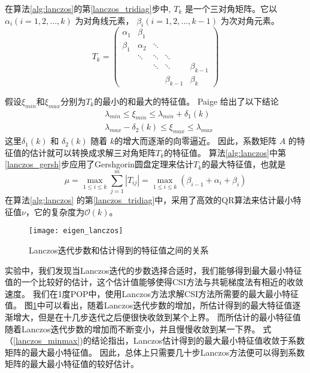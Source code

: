 在算法\ref{alg:lanczos}的第\ref{lanczos_tridiag}步中, $T_k$ 是一个三对角矩阵。它以 $\alpha_i (i=1,2,...,k)$ 为对角线元素， $\beta_i (i=1,2,...,k-1)$ 为次对角元素。 
\[ T_{k} = \left(\begin{array}{ccccc}
\alpha_1 & \beta_1  &  &&  \\
\beta_1 & \alpha_2  & \ddots &&  \\
  & \ddots & \ddots & \ddots&  \\
  &    &\ddots  &\ddots& \beta_{k-1} \\
 &    &  &\beta_{k-1}& \beta_{k} 
\end{array} \right)\]

假设$\xi_{min}$和$\xi_{max}$分别为$T_k$的最小的和最大的特征值。
Paige\cite{Paige1980235} 给出了以下结论
\begin{equation}\label{lanczos_minmax}
\begin{aligned} 
&\lambda_{min} \le \xi_{min} \le \lambda_{min}+\delta_1(k) \\
&\lambda_{max}-\delta_2(k)  \le \xi_{max} \le \lambda_{max}
\end{aligned}
\end{equation}
这里$\delta_1(k)$ 和 $\delta_2(k)$ 随着 $k$的增大而逐渐的向零逼近。 因此，系数矩阵 $A$ 的特征值的估计就可以转换成求解三对角矩阵$T_k$的特征值。 
算法\ref{alg:lanczos}中第\ref{lanczos_gersh}步应用了Gershgorin圆盘定理来估计$T_k$的最大特征值，也就是 
\begin{equation}
\mu = \max_{1 \le i \le k}\sum^m_{j=1}|T_{ij}|=\max_{1 \le i \le k}(\beta_{i-1}+\alpha_i +\beta_{i})
\end{equation}
在算法\ref{alg:lanczos} 的第\ref{lanczos_tridiag}中，采用了高效的QR算法\cite{ortega1963llt}来估计最小特征值$\nu$，它的复杂度为$\mathcal{O}(k)$。
 
\begin {figure}%
\centering
\texttt{[image: eigen\_lanczos]}
\caption[] {Lanczos迭代步数和估计得到的特征值之间的关系\label{fig:lanczos_eigs}}
\end{figure}
实验中，我们发现当Lanczos迭代的步数选择合适时，我们能够得到最大最小特征值的一个比较好的估计，这个估计值能够使得CSI方法与共轭梯度法有相近的收敛速度。  
我们在1度POP中，使用Lanczos方法求解CSI方法所需要的最大最小特征值。 
图\ref{fig:lanczos_eigs}中可以看出，随着Lanczos迭代步数的增加，所估计得到的最大特征值逐渐增大，但是在十几步迭代之后便很快收敛到某个上界。
而所估计的最小特征值随着Lanczos迭代步数的增加而不断变小，并且慢慢收敛到某一下界。 
式（\ref{lanczos_minmax})的结论指出，Lanczos估计得到的最大最小特征值收敛于系数矩阵的最大最小特征值。
因此，总体上只需要几十步Lanczos方法便可以得到系数矩阵的最大最小特征值的较好估计。

